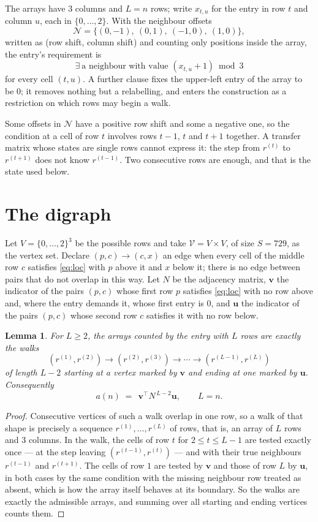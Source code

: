 \documentclass[11pt,a4paper]{article}
\theoremstyle{plain}
\newtheorem{lemma}[theorem]{Lemma}
\theoremstyle{definition}
\begin{document}
The arrays have $3$ columns and $L=n$ rows; write $x_{t,u}$ for the entry in
row $t$ and column $u$, each in $\{0,\dots,2\}$. With the neighbour offsets
\[
\mathcal N=\{(0,-1),\ (0,1),\ (-1,0),\ (1,0)\},
\]
written as (row shift, column shift) and counting only positions inside the array, the
entry's requirement is
\begin{equation}\label{eq:loc}
\exists\ \text{a neighbour with value }(x_{t,u}+1)\bmod 3
\end{equation}
for every cell $(t,u)$. A further clause fixes the upper-left entry of the array to be $0$; it removes nothing but a relabelling, and enters the construction as a restriction on which rows may begin a walk.

Some offsets in $\mathcal N$ have a positive row shift and some a negative one, so the
condition at a cell of row $t$ involves rows $t-1$, $t$ and $t+1$ together. A transfer
matrix whose states are single rows cannot express it: the step from $r^{(t)}$ to
$r^{(t+1)}$ does not know $r^{(t-1)}$. Two consecutive rows are enough, and that is
the state used below.

\section{The digraph}

Let $V=\{0,\dots,2\}^{3}$ be the possible rows and take
$\mathcal V=V\times V$, of size $S=729$, as the vertex set. Declare $(p,c)\to(c,x)$ an edge
when every cell of the middle row $c$ satisfies \eqref{eq:loc} with $p$ above it and $x$
below it; there is no edge between pairs that do not overlap in this way. Let $N$ be the
adjacency matrix, $\mathbf{v}$ the indicator of the pairs $(p,c)$ whose first row $p$
satisfies \eqref{eq:loc} with no row above and, where the entry demands it, whose first entry is $0$, and $\mathbf{u}$ the indicator of
the pairs $(p,c)$ whose second row $c$ satisfies it with no row below.

\begin{lemma}\label{lem:walk}
For $L\ge2$, the arrays counted by the entry with $L$ rows are exactly the walks
\[
(r^{(1)},r^{(2)})\to(r^{(2)},r^{(3)})\to\cdots\to(r^{(L-1)},r^{(L)})
\]
of length $L-2$ starting at a vertex marked by $\mathbf{v}$ and ending at one marked by
$\mathbf{u}$. Consequently
\[
a(n)\;=\;\,\mathbf{v}^{\!\top}N^{\,L-2}\mathbf{u},\qquad L=n .
\]
\end{lemma}

\begin{proof}
Consecutive vertices of such a walk overlap in one row, so a walk of that shape is
precisely a sequence $r^{(1)},\dots,r^{(L)}$ of rows, that is, an array of $L$ rows
and $3$ columns. In the walk, the cells of row $t$ for $2\le t\le L-1$ are tested
exactly once --- at the step leaving $(r^{(t-1)},r^{(t)})$ --- and with their true
neighbours $r^{(t-1)}$ and $r^{(t+1)}$. The cells of row $1$ are tested by
$\mathbf{v}$ and those of row $L$ by $\mathbf{u}$, in both cases by the same condition
with the missing neighbour row treated as absent, which is how the array itself behaves at
its boundary. So the walks are exactly the admissible arrays, and summing over all starting
and ending vertices counts them.
\end{proof}
\end{document}
